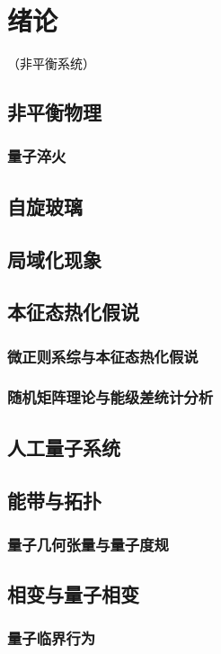 
\chapter{绪论}

（非平衡系统）

\section{非平衡物理}

	\subsection{量子淬火}

\section{自旋玻璃}

\section{局域化现象}

\section{本征态热化假说}

	\subsection{微正则系综与本征态热化假说}

	\subsection{随机矩阵理论与能级差统计分析}

\section{人工量子系统}

\section{能带与拓扑}

	\subsection{量子几何张量与量子度规}
	
\section{相变与量子相变}
	
	\subsection{量子临界行为}

